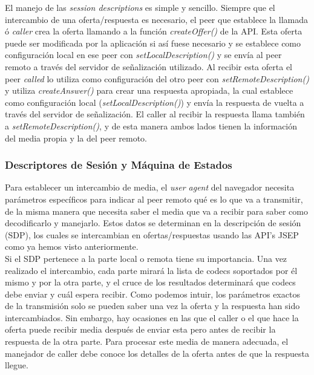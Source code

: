 El manejo de las \textit{session descriptions} es simple y sencillo. Siempre que el intercambio de una oferta/respuesta es necesario, el peer que establece la llamada ó \textit{caller} crea la oferta llamando a la función \emph{createOffer()} de la API. Esta oferta puede ser modificada por la aplicación si así fuese necesario y se establece como configuración local en ese peer con \emph{setLocalDescription()} y se envía al peer remoto a través del servidor de señalización utilizado. Al recibir esta oferta el peer \textit{called} lo utiliza como configuración del otro peer con \emph{setRemoteDescription()} y utiliza \emph{createAnswer()} para crear una respuesta apropiada, la cual establece como configuración local (\emph{setLocalDescription()}) y envía la respuesta de vuelta a través del servidor de señalización. El caller al recibir la respuesta llama también a \emph{setRemoteDescription()}, y de esta manera ambos lados tienen la información del media propia y la del peer remoto.\\ 


\subsubsection{Descriptores de Sesión y Máquina de Estados}

Para establecer un intercambio de media, el \textit{user agent} del navegador necesita parámetros específicos para indicar al peer remoto qué es lo que va a transmitir, de la misma manera que necesita saber el media que va a recibir para saber como decodificarlo y manejarlo. Estos datos se determinan en la descripción de sesión (SDP), los cuales se intercambian en ofertas/respuestas usando las API's JSEP como ya hemos visto anteriormente.\\

Si el SDP pertenece a la parte local o remota tiene su importancia. Una vez realizado el intercambio, cada parte mirará la lista de codecs soportados por él mismo y por la otra parte, y el cruce de los resultados determinará que codecs debe enviar y cuál espera recibir. Como podemos intuir, los parámetros exactos de la transmisión solo se pueden saber una vez la oferta y la respuesta han sido intercambiados. Sin embargo, hay ocasiones en las que el caller o el que hace la oferta puede recibir media después de enviar esta pero antes de recibir la respuesta de la otra parte. Para procesar este media de manera adecuada, el manejador de caller debe conoce los detalles de la oferta antes de que la respuesta llegue.\\

